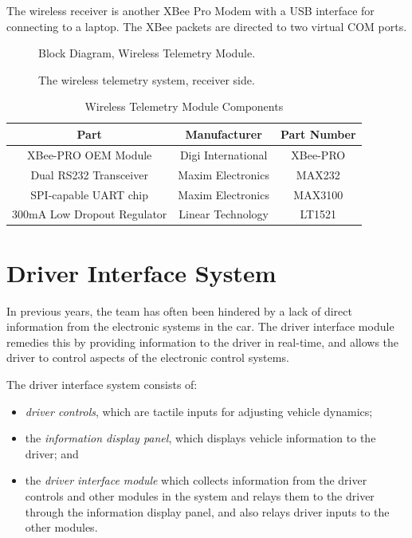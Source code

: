 The wireless receiver is another XBee Pro Modem with a USB interface for connecting to a laptop. The XBee packets are directed to two virtual COM ports.

  \begin{figure}[H]
    \centering
      
    \caption{Block Diagram, Wireless Telemetry Module.\label{fig:tele_tx_overview}}
  \end{figure}

  \begin{figure}[H]
    \centering
      
    \caption{The wireless telemetry system, receiver side.\label{fig:tele_rx_overview}}
  \end{figure}

  \begin{table}[H]
    \caption{Wireless Telemetry Module Components\label{tab:Wireless-Telemetry-Module}}
    \centering
      \begin{tabular}{|c|c|c|}
	\hline 
	Part & Manufacturer & Part Number\tabularnewline
	\hline
	\hline
	XBee-PRO OEM Module & Digi International & XBee-PRO\tabularnewline
	\hline 
	Dual RS232 Transceiver & Maxim Electronics & MAX232\tabularnewline
	\hline 
	SPI-capable UART chip & Maxim Electronics & MAX3100\tabularnewline
	\hline 
	300mA Low Dropout Regulator & Linear Technology & LT1521\tabularnewline
	\hline
      \end{tabular}
  \end{table}

%
%

\section{Driver Interface System}
\label{sec:driver_interface_system}


In previous years, the team has often been hindered by a lack of direct information from the electronic systems in the car. The driver interface module remedies this by providing information to the driver in real-time, and allows the driver to control aspects of the electronic control systems.

The driver interface system consists of:

\begin{itemize}
\item \emph{driver controls}, which are tactile inputs for adjusting vehicle dynamics; 
\item the \emph{information display panel}, which displays vehicle information to the driver; and
\item the \emph{driver interface module} which collects information from the driver controls and other modules in the system and relays them to the driver through the information display panel, and also relays driver inputs to the other modules.
\end{itemize}

